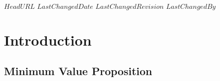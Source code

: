 \svnidlong
{$HeadURL$}
{$LastChangedDate$}
{$LastChangedRevision$}
{$LastChangedBy$}

\chapter{Introduction}

\begin{introduction}
\end{introduction}

\section{Minimum Value Proposition}
\begin{introduction}
  
\end{introduction}

